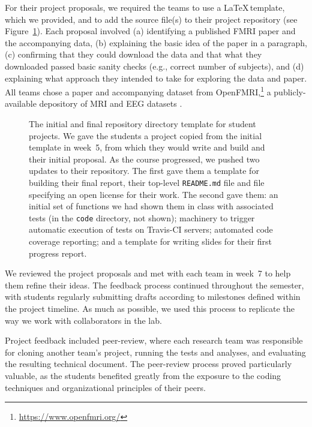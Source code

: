 For their project proposals, we required the teams to use a \LaTeX\,template,
which we provided, and to add the source file(s) to their project repository
(see Figure~\ref{fig:repo}).
Each proposal involved
(a) identifying a published FMRI paper and the accompanying data,
(b) explaining the basic idea of the paper in a paragraph,
(c) confirming that they could download the data and that what they
downloaded passed basic sanity checks (e.g., correct number of subjects), and
(d) explaining what approach they intended to take for exploring
the data and paper.
All teams chose a paper and accompanying dataset from
OpenFMRI,\footnote{\url{https://www.openfmri.org/}} a publicly-available
depository of MRI and EEG datasets
\citep{poldrack2013toward,poldrack2015openfmri}.

\begin{figure}
\centering

\caption{The initial and final repository directory template for student
    projects.  We gave the students a project copied from the initial template
    in week~5, from which they would write and build and their initial
    proposal.  As the course progressed, we pushed two updates to their
    repository. The first gave them a template for building their final
    report, their top-level \texttt{README.md} file and file specifying an
    open license for their work. The second gave them: an initial set of
    functions we had shown them in class with associated tests (in the
    \texttt{code} directory, not shown); machinery to trigger automatic
    execution of tests on Travis-CI servers; automated code coverage
    reporting; and a template for writing slides for their first progress
    report.}
\label{fig:repo}
\end{figure}

We reviewed the project proposals and met with each team in week~7 to help
them refine their ideas.
The feedback process continued throughout the semester, with students
regularly submitting drafts according to milestones defined within the project
timeline.
As much as possible, we used this process to replicate the way we
work with collaborators in the lab.

Project feedback included peer-review, where each research team was
responsible for cloning another team's project, running the tests and
analyses, and evaluating the resulting technical document.
The peer-review process proved particularly valuable, as the students 
benefited greatly from the exposure to the coding techniques and 
organizational principles of their peers.

